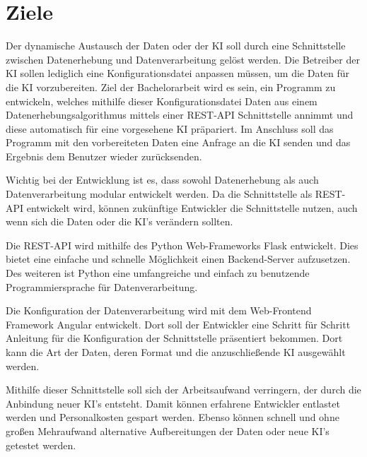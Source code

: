 \section{Ziele}
Der dynamische Austausch der Daten oder der KI soll durch eine Schnittstelle zwischen Datenerhebung und Datenverarbeitung gelöst werden. Die Betreiber der KI sollen lediglich eine Konfigurationsdatei anpassen müssen, um die Daten für die KI vorzubereiten. Ziel der Bachelorarbeit wird es sein, ein Programm zu entwickeln, welches mithilfe dieser Konfigurationsdatei Daten aus einem Datenerhebungsalgorithmus mittels einer REST-API Schnittstelle annimmt und diese automatisch für eine vorgesehene KI präpariert. Im Anschluss soll das Programm mit den vorbereiteten Daten eine Anfrage an die KI senden und das Ergebnis dem Benutzer wieder zurücksenden. 

Wichtig bei der Entwicklung ist es, dass sowohl Datenerhebung als auch Datenverarbeitung modular entwickelt werden. Da die Schnittstelle als REST-API entwickelt wird, können zukünftige Entwickler die Schnittstelle nutzen, auch wenn sich die Daten oder die KI's verändern sollten. 

Die REST-API wird mithilfe des Python Web-Frameworks Flask entwickelt. Dies bietet eine einfache und schnelle Möglichkeit einen Backend-Server aufzusetzen. Des weiteren ist Python eine umfangreiche und einfach zu benutzende Programmiersprache für Datenverarbeitung. 

Die Konfiguration der Datenverarbeitung wird mit dem Web-Frontend Framework Angular entwickelt. Dort soll der Entwickler eine Schritt für Schritt Anleitung für die Konfiguration der Schnittstelle präsentiert bekommen. Dort kann die Art der Daten, deren Format und die anzuschließende KI ausgewählt werden. 

Mithilfe dieser Schnittstelle soll sich der Arbeitsaufwand verringern, der durch die Anbindung neuer KI's entsteht. Damit können erfahrene Entwickler entlastet werden und Personalkosten gespart werden. Ebenso können schnell und ohne großen Mehraufwand alternative Aufbereitungen der Daten oder neue KI's getestet werden.